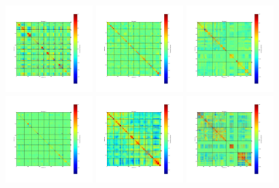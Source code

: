\begin{figure}[ht]
\begin{center}
\includegraphics[width=0.3\textwidth]{Figures/DarkTests/corrmat_TOI_CM_array_3_20160504s97.pdf}
\includegraphics[width=0.3\textwidth]{Figures/DarkTests/corrmat_TOI_PCA_array_1_20160504s97.pdf}
\includegraphics[width=0.3\textwidth]{Figures/DarkTests/corrmat_TOI_PCA_array_2_20160504s97.pdf}
\includegraphics[width=0.3\textwidth]{Figures/DarkTests/corrmat_TOI_PCA_array_3_20160504s97.pdf}
\includegraphics[width=0.3\textwidth]{Figures/DarkTests/corrmat_TOI_BC_array_1_20160504s97.pdf}
\includegraphics[width=0.3\textwidth]{Figures/DarkTests/corrmat_TOI_BC_array_2_20160504s97.pdf}

\end{center}
\end{figure}
